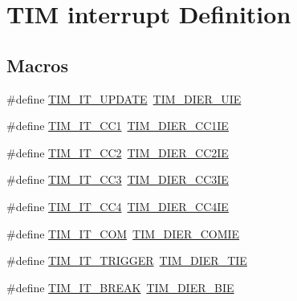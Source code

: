 \hypertarget{group___t_i_m___interrupt__definition}{}\section{T\+IM interrupt Definition}
\label{group___t_i_m___interrupt__definition}
\subsection*{Macros}
\begin{DoxyCompactItemize}
\item 
\#define \mbox{\hyperlink{group___t_i_m___interrupt__definition_ga6a48ecf88cae0402ff084202bfdd4f8e}{T\+I\+M\+\_\+\+I\+T\+\_\+\+U\+P\+D\+A\+TE}}~\mbox{\hyperlink{group___peripheral___registers___bits___definition_ga5c6d3e0495e6c06da4bdd0ad8995a32b}{T\+I\+M\+\_\+\+D\+I\+E\+R\+\_\+\+U\+IE}}
\item 
\#define \mbox{\hyperlink{group___t_i_m___interrupt__definition_ga02267a938ab4722c5013fffa447cf5a6}{T\+I\+M\+\_\+\+I\+T\+\_\+\+C\+C1}}~\mbox{\hyperlink{group___peripheral___registers___bits___definition_ga1ba7f7ca97eeaf6cc23cd6765c6bf678}{T\+I\+M\+\_\+\+D\+I\+E\+R\+\_\+\+C\+C1\+IE}}
\item 
\#define \mbox{\hyperlink{group___t_i_m___interrupt__definition_ga60f6b6c424b62ca58d3fafd8f5955e4f}{T\+I\+M\+\_\+\+I\+T\+\_\+\+C\+C2}}~\mbox{\hyperlink{group___peripheral___registers___bits___definition_ga757c59b690770adebf33e20d3d9dec15}{T\+I\+M\+\_\+\+D\+I\+E\+R\+\_\+\+C\+C2\+IE}}
\item 
\#define \mbox{\hyperlink{group___t_i_m___interrupt__definition_ga6aef020aebafd9e585283fbbaf8b841f}{T\+I\+M\+\_\+\+I\+T\+\_\+\+C\+C3}}~\mbox{\hyperlink{group___peripheral___registers___bits___definition_ga4edf003f04bcf250bddf5ed284201c2e}{T\+I\+M\+\_\+\+D\+I\+E\+R\+\_\+\+C\+C3\+IE}}
\item 
\#define \mbox{\hyperlink{group___t_i_m___interrupt__definition_ga1dce7f1bc32a258f2964cb7c05f413a6}{T\+I\+M\+\_\+\+I\+T\+\_\+\+C\+C4}}~\mbox{\hyperlink{group___peripheral___registers___bits___definition_ga6ad0f562a014572793b49fe87184338b}{T\+I\+M\+\_\+\+D\+I\+E\+R\+\_\+\+C\+C4\+IE}}
\item 
\#define \mbox{\hyperlink{group___t_i_m___interrupt__definition_gaeb7eff6c39922814e7ee47c0820c3d9f}{T\+I\+M\+\_\+\+I\+T\+\_\+\+C\+OM}}~\mbox{\hyperlink{group___peripheral___registers___bits___definition_gade8a374e04740aac1ece248b868522fe}{T\+I\+M\+\_\+\+D\+I\+E\+R\+\_\+\+C\+O\+M\+IE}}
\item 
\#define \mbox{\hyperlink{group___t_i_m___interrupt__definition_ga2a577f2eee61f101cf551d86c4d73333}{T\+I\+M\+\_\+\+I\+T\+\_\+\+T\+R\+I\+G\+G\+ER}}~\mbox{\hyperlink{group___peripheral___registers___bits___definition_gaa755fef2c4e96c63f2ea1cd9a32f956a}{T\+I\+M\+\_\+\+D\+I\+E\+R\+\_\+\+T\+IE}}
\item 
\#define \mbox{\hyperlink{group___t_i_m___interrupt__definition_ga351a8f27975e0af87f4bb37a4feaa636}{T\+I\+M\+\_\+\+I\+T\+\_\+\+B\+R\+E\+AK}}~\mbox{\hyperlink{group___peripheral___registers___bits___definition_ga1fcb0d6d9fb7486a5901032fd81aef6a}{T\+I\+M\+\_\+\+D\+I\+E\+R\+\_\+\+B\+IE}}
\end{DoxyCompactItemize}


